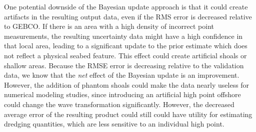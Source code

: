 One potential downside of the Bayesian update approach is that it could create artifacts in the resulting output data, even if the RMS error is decreased relative to GEBCO. If there is an area with a high density of incorrect point measurements, the resulting uncertainty data might have a high confidence in that local area, leading to a significant update to the prior estimate which does not reflect a physical seabed  feature. This effect could create artificial shoals or shallow areas.  Because the RMSE error is decreasing relative to the validation data, we know that the \emph{net} effect of the Bayesian update is an improvement. However, the addition of phantom shoals could make the data nearly useless for numerical modeling studies, since introducing an artificial high point offshore could change the wave transformation significantly. However, the decreased average error of the resulting product could still could have utility for estimating dredging quantities, which are less sensitive to an individual high point. 